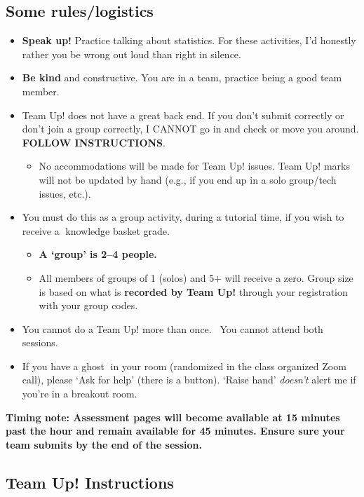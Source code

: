\documentclass[
  openany]{book}
\providecommand{\tightlist}{%
  \setlength{\itemsep}{0pt}\setlength{\parskip}{0pt}}
\begin{document}
\hypertarget{some-ruleslogistics}{%
\subsection{Some rules/logistics}\label{some-ruleslogistics}}

\begin{itemize}
\item
  \textbf{Speak up!} Practice talking about statistics. For these activities, I'd honestly rather you be wrong out loud than right in silence.
\item
  \textbf{Be kind} and constructive. You are in a team, practice being a good team member.
\item
  Team Up! does not have a great back end. If you don't submit correctly or don't join a group correctly, I CANNOT go in and check or move you around. \textbf{FOLLOW INSTRUCTIONS}.

  \begin{itemize}
  \tightlist
  \item
    No accommodations will be made for Team Up! issues. Team Up! marks will not be updated by hand (e.g., if you end up in a solo group/tech issues, etc.).
  \end{itemize}
\item
  You must do this as a group activity, during a tutorial time, if you wish to receive a 🧺knowledge basket grade.

  \begin{itemize}
  \item
    \textbf{A `group' is 2--4 people.}
  \item
    All members of groups of 1 (solos) and 5+ will receive a zero. Group size is based on what is \textbf{recorded by Team Up!} through your registration with your group codes.
  \end{itemize}
\item
  You cannot do a Team Up! more than once.~ You cannot attend both sessions.
\item
  If you have a ghost 👻in your room (randomized in the class organized Zoom call), please `Ask for help' (there is a button). `Raise hand' \emph{doesn't} alert me if you're in a breakout room.
\end{itemize}

\textbf{Timing note: Assessment pages will become available at 15 minutes past the hour and remain available for 45 minutes. Ensure sure your team submits by the end of the session.}

\hypertarget{team-up-instructions}{%
\subsection{Team Up! Instructions}\label{team-up-instructions}}
\end{document}
